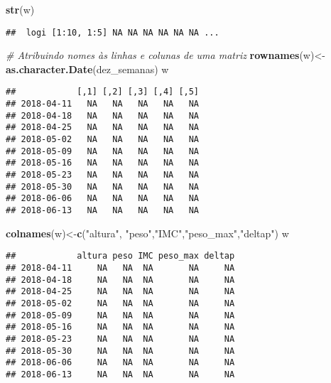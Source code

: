 \documentclass[]{article}
\newenvironment{Shaded}{\begin{snugshade}}{\end{snugshade}}
\newcommand{\KeywordTok}[1]{\textcolor[rgb]{0.13,0.29,0.53}{\textbf{#1}}}
\newcommand{\StringTok}[1]{\textcolor[rgb]{0.31,0.60,0.02}{#1}}
\newcommand{\CommentTok}[1]{\textcolor[rgb]{0.56,0.35,0.01}{\textit{#1}}}
\newcommand{\NormalTok}[1]{#1}
\begin{document}
\begin{Shaded}
\begin{Highlighting}[]
\KeywordTok{str}\NormalTok{(w)}
\end{Highlighting}
\end{Shaded}

\begin{verbatim}
##  logi [1:10, 1:5] NA NA NA NA NA NA ...
\end{verbatim}

\begin{Shaded}
\begin{Highlighting}[]
\CommentTok{# Atribuindo nomes às linhas e colunas de uma matriz}
\KeywordTok{rownames}\NormalTok{(w)<-}\KeywordTok{as.character.Date}\NormalTok{(dez_semanas)}
\NormalTok{w}
\end{Highlighting}
\end{Shaded}

\begin{verbatim}
##            [,1] [,2] [,3] [,4] [,5]
## 2018-04-11   NA   NA   NA   NA   NA
## 2018-04-18   NA   NA   NA   NA   NA
## 2018-04-25   NA   NA   NA   NA   NA
## 2018-05-02   NA   NA   NA   NA   NA
## 2018-05-09   NA   NA   NA   NA   NA
## 2018-05-16   NA   NA   NA   NA   NA
## 2018-05-23   NA   NA   NA   NA   NA
## 2018-05-30   NA   NA   NA   NA   NA
## 2018-06-06   NA   NA   NA   NA   NA
## 2018-06-13   NA   NA   NA   NA   NA
\end{verbatim}

\begin{Shaded}
\begin{Highlighting}[]
\KeywordTok{colnames}\NormalTok{(w)<-}\KeywordTok{c}\NormalTok{(}\StringTok{"altura"}\NormalTok{, }\StringTok{"peso"}\NormalTok{,}\StringTok{"IMC"}\NormalTok{,}\StringTok{"peso_max"}\NormalTok{,}\StringTok{"deltap"}\NormalTok{)}
\NormalTok{w}
\end{Highlighting}
\end{Shaded}

\begin{verbatim}
##            altura peso IMC peso_max deltap
## 2018-04-11     NA   NA  NA       NA     NA
## 2018-04-18     NA   NA  NA       NA     NA
## 2018-04-25     NA   NA  NA       NA     NA
## 2018-05-02     NA   NA  NA       NA     NA
## 2018-05-09     NA   NA  NA       NA     NA
## 2018-05-16     NA   NA  NA       NA     NA
## 2018-05-23     NA   NA  NA       NA     NA
## 2018-05-30     NA   NA  NA       NA     NA
## 2018-06-06     NA   NA  NA       NA     NA
## 2018-06-13     NA   NA  NA       NA     NA
\end{verbatim}
\end{document}
